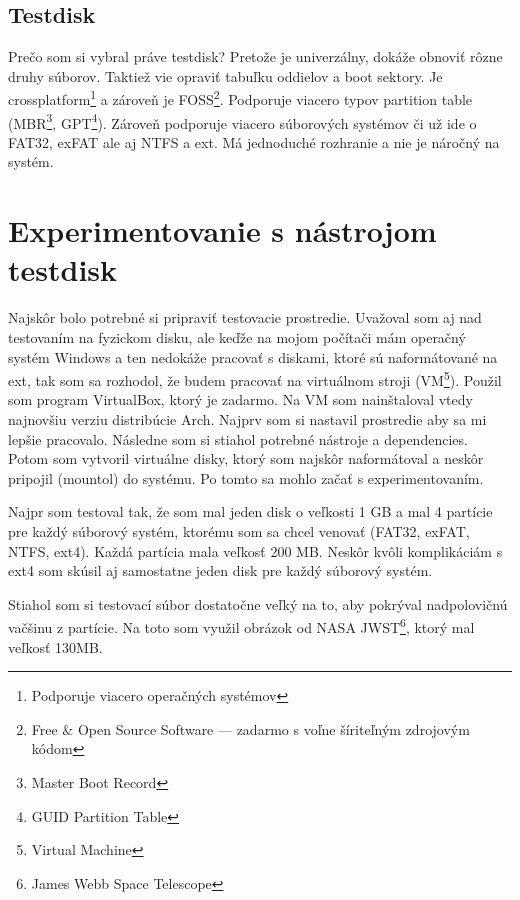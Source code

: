 \documentclass[12pt,oneside,slovak,a4paper]{article}
\begin{document}
\subsection{Testdisk}
Prečo som si vybral práve testdisk? Pretože je univerzálny, dokáže obnoviť rôzne druhy súborov. Taktiež vie opraviť tabuľku oddielov a boot sektory. Je crossplatform\footnote{Podporuje viacero operačných systémov} a zároveň je FOSS\footnote{Free \& Open Source Software --- zadarmo s voľne šíriteľným zdrojovým kódom}. Podporuje viacero typov partition table (MBR\footnote{Master Boot Record}, GPT\footnote{GUID Partition Table}). Zároveň podporuje viacero súborových systémov či už ide o FAT32, exFAT ale aj NTFS a ext. Má jednoduché rozhranie a nie je náročný na systém.


\section{Experimentovanie s nástrojom testdisk}


Najskôr bolo potrebné si pripraviť testovacie prostredie. Uvažoval som aj nad testovaním na fyzickom disku, ale keďže na mojom počítači mám operačný systém Windows a ten nedokáže pracovať s diskami, ktoré sú naformátované na ext, tak som sa rozhodol, že budem pracovať na virtuálnom stroji (VM\footnote{Virtual Machine}). Použil som program VirtualBox, ktorý je zadarmo. Na VM som nainštaloval vtedy najnovšiu verziu distribúcie Arch. Najprv som si nastavil prostredie aby sa mi lepšie pracovalo. Následne som si stiahol potrebné nástroje a dependencies. Potom som vytvoril virtuálne disky, ktorý som najskôr naformátoval a neskôr pripojil (mountol) do systému. Po tomto sa mohlo začať s experimentovaním.

Najpr som testoval tak, že som mal jeden disk o veľkosti 1 GB a mal 4 partície pre každý súborový systém, ktorému som sa chcel venovať (FAT32, exFAT, NTFS, ext4). Každá partícia mala veľkosť 200 MB. Neskôr kvôli komplikáciám s ext4 som skúsil aj samostatne jeden disk pre každý súborový systém.

Stiahol som si testovací súbor dostatočne veľký na to, aby pokrýval nadpolovičnú vačšinu z partície. Na toto som využil obrázok od NASA JWST\footnote{James Webb Space Telescope}, ktorý mal veľkosť 130MB.
\end{document}
